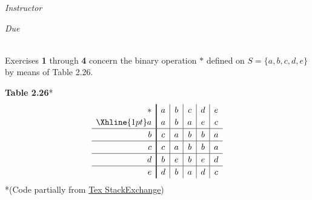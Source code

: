 \documentclass[12pt, oneside]{book}
\newcommand{\thickvrule}{\vrule width 1pt}
\newcommand{\thickhrule}{\Xhline{1pt}}
\begin{document}
\begin{titlepage}
\begin{center}
\begin{large}
            \vspace*{1\baselineskip}

            \textit{Instructor} \\[1ex] %
            \professor

            \vspace*{1\baselineskip}

            \textit{Due}\\[1ex]
            {\scshape  \finaldate} \\[0.3\baselineskip] %

            \thispagestyle{empty}

        \end{large}
    \end{center}
\end{titlepage}


Exercises \textbf{1} through \textbf{4} concern the binary operation \(*\) defined on \(S = \{a, b, c, d, e\}\) by means of Table 2.26.


\begin{center}
    \textbf{Table 2.26}*%
    \[ \renewcommand\arraystretch{1.2}
        \begin{array}{r!{\thickvrule}c|c|c|c|c}
            * & a & b & c & d & e \\
            \thickhrule
            a & a & b & a & e & c \\
            \hline
            b & c & a & b & b & a \\
            \hline
            c & c & a & b & b & a \\
            \hline
            d & b & e & b & e & d \\
            \hline
            e & d & b & a & d & c \\
        \end{array}\]%
    *(Code partially from \href{https://tex.stackexchange.com/questions/198282/table-for-binary-operations}{Tex StackExchange})
\end{center}

\vspace{1em}
\end{document}
